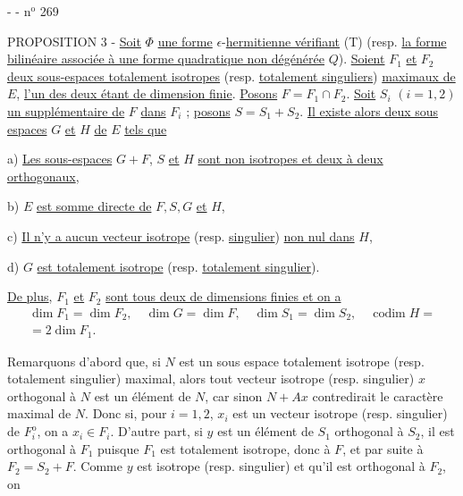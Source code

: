 -  - \hfill n$^{\mathrm{o}}$ 269

PROPOSITION 3 - \uline{Soit} $\Phi$ \uline{une forme} $\epsilon$-\uline{hermitienne vérifiant} (T) (resp. \uline{la forme bilinéaire associée à une forme quadratique non dégénérée} $Q$). \uline{Soient} $F_1$ \uline{et} $F_2$ \uline{deux sous-espaces totalement isotropes} (resp. \uline{totalement singuliers}) \uline{maximaux de} $E$, \uline{l'un des deux étant de dimension finie}. \uline{Posons} $F=F_1\cap F_2$. \uline{Soit} $S_i$ $(i=1,2)$ \uline{un supplémentaire de} $F$ \uline{dans} $F_i$ ; \uline{posons} $S=S_1+S_2$. \uline{Il existe alors deux sous espaces} $G$ \uline{et} $H$ \uline{de} $E$ \uline{tels que}

a) \uline{Les sous-espaces} $G+F$, $S$ \uline{et} $H$ \uline{sont non isotropes et deux à deux orthogonaux},

b) $E$ \uline{est somme directe de} $F,S,G$ \uline{et} $H$,

c) \uline{Il n'y a aucun vecteur isotrope} (resp. \uline{singulier}) \uline{non nul dans} $H$,

d) $G$ \uline{est totalement isotrope} (resp. \uline{totalement singulier}).

\uline{De plus}, $F_1$ \uline{et} $F_2$ \uline{sont tous deux de dimensions finies et on a}
\[
\begin{gathered}\dim F_1=\dim F_2,\quad\dim G=\dim F,\quad\dim S_1=\dim S_2,\quad\operatorname{codim}H={}\\=2\dim F_1.\end{gathered}
\]

Remarquons d'abord que, si $N$ est un sous espace totalement isotrope (resp. totalement singulier) maximal, alors tout vecteur isotrope (resp. singulier) $x$ orthogonal à $N$ est un élément de $N$, car sinon $N+Ax$ contredirait le caractère maximal de $N$.
Donc si, pour $i=1,2$, $x_i$ est un vecteur isotrope (resp. singulier) de $F_i^{\mathrm o}$, on a $x_i\in F_i$. D'autre part, si $y$ est un élément de $S_1$ orthogonal à $S_2$, il est orthogonal à $F_1$ puisque $F_1$ est totalement isotrope, donc à $F$, et par suite à $F_2=S_2+F$. Comme $y$ est isotrope (resp. singulier) et qu'il est orthogonal à $F_2$, on
